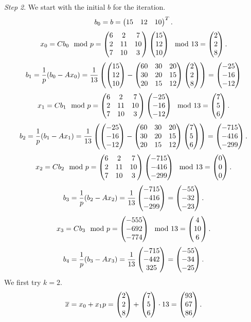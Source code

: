\documentclass[12pt]{article}
\theoremstyle{plain}
\begin{document}
\emph{Step 2}. We start with the initial $b$ for the iteration.
$$b_0 = b = \m{15 & 12 & 10}^T.$$
$$x_0 = Cb_0 \mod p = \m{6 & 2 & 7 \\ 2 & 11 & 10 \\ 7 & 10 & 3}\m{15 \\ 12 \\ 10}\mod 13 = \m{2\\2\\8}.$$
$$b_1 = \frac{1}{p}(b_0-Ax_0)= \frac{1}{13}\left(\m{15 \\ 12 \\ 10}-\m{60 & 30 & 20 \\
30 & 20 & 15 \\
20 & 15 & 12}\m{2\\2\\8}\right) = \m{-25\\-16\\-12}$$
$$x_1 = Cb_1 \mod p = \m{6 & 2 & 7 \\ 2 & 11 & 10 \\ 7 & 10 & 3}\m{-25 \\ -16 \\ -12}\mod 13 = \m{7\\5\\6}.$$
$$b_2 = \frac{1}{p}(b_1-Ax_1)= \frac{1}{13}\left(\m{-25\\-16\\-12}-\m{60 & 30 & 20 \\
30 & 20 & 15 \\
20 & 15 & 12}\m{7\\5\\6}\right) = \m{-715\\-416\\-299}.$$
$$x_2 = Cb_2 \mod p = \m{6 & 2 & 7 \\ 2 & 11 & 10 \\ 7 & 10 & 3}\m{-715\\-416\\-299} \mod 13 = \m{0\\0\\0}.$$
$$b_3 = \frac{1}{p}(b_2-Ax_2)= \frac{1}{13}\m{-715\\-416\\-299} = \m{-55\\-32\\-23}.$$
$$x_3 = Cb_3 \mod p = \m{-555\\-692\\-774}\mod 13 = \m{4\\10\\6}.$$
$$b_4 = \frac{1}{p}(b_3-Ax_3) = \frac{1}{13}\m{-715\\-442\\325} = \m{-55\\-34\\-25}.$$
We first try $k=2$.
$$\overline{x} = x_0 + x_1 p = \m{2\\2\\8} + \m{7\\5\\6} \cdot 13 = \m{93\\67\\86}.$$
\end{document}
